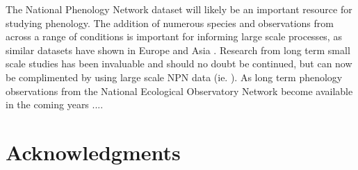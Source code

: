 \documentclass[fleqn,10pt,lineno]{wlpeerj} %
\begin{document}
The National Phenology Network dataset will likely be an important resource for studying phenology.  The addition of numerous species and observations from across a range of conditions is important for informing large scale processes, as similar datasets have shown in Europe \citep{olsson2014, basler2016} and Asia \citep{xu2013, zhang2017}. Research from long term small scale studies has been invaluable and should no doubt be continued, but can now be complimented by using large scale NPN data (ie. \citep{jeong2013, melaas2016}). As long term phenology observations from the National Ecological Observatory Network \citep{elmendorf2016} become available in the coming years  ....


\section*{Acknowledgments}



\end{document}
